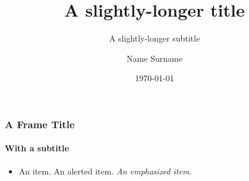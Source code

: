 \documentclass[aspectratio=1610, 10pt]{beamer}
\title{A slightly-longer title}
\subtitle{A slightly-longer subtitle}
\author[N. Surname]{Name Surname}
\institute[ShortConf]{Conference Name}
\date[\today]{\today}
\begin{document}
\maketitle

\begin{frame}
	\frametitle{A Frame Title}
	\framesubtitle{With a subtitle}
	\begin{itemize}
		\item An item.
		\atem \alert{An alerted item.}
		\etem \emph{An emphasized item.}
	\end{itemize}
\end{frame}

\thankyou
\end{document}
